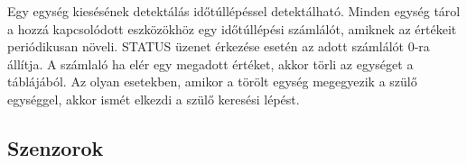 Egy egység kiesésének detektálás időtúllépéssel detektálható. Minden egység tárol a hozzá kapcsolódott eszközökhöz egy időtúllépési számlálót, amiknek az értékeit periódikusan növeli. STATUS üzenet érkezése esetén az adott számlálót 0-ra állítja. A számlaló ha elér egy megadott értéket, akkor törli az egységet a táblájából. Az olyan esetekben, amikor a törölt egység megegyezik a szülő egységgel, akkor ismét elkezdi a szülő keresési lépést.

\subsection{Szenzorok}